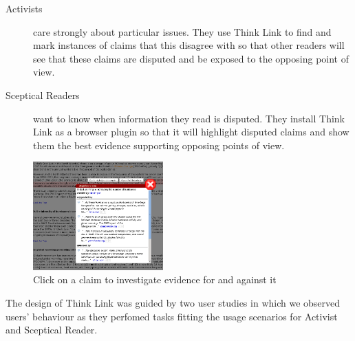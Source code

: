 \documentclass{chi2009}
\newcommand{\todo}[1]{}
\begin{document}
\begin{description}
\item[Activists] care strongly about particular issues. They use Think Link to find and mark instances of claims that this disagree with so that other readers will see that these claims are disputed and be exposed to the opposing point of view.

\item[Sceptical Readers] want to know when information they read is disputed. They install Think Link as a browser plugin so that it will highlight disputed claims and show them the best evidence supporting opposing points of view.
\end{description}

\begin{figure}[tb]
	\begin{center}
	\includegraphics[width=5cm]{../screenshots/v2_popup_dim.png}
	\caption{Click on a claim to investigate evidence for and against it}
	\label{claimview}
	\end{center}
\end{figure}

\todo{Claim panel should have 'more' buttons}


The design of Think Link was guided by two user studies in which we observed users' behaviour as they perfomed tasks fitting the usage scenarios for Activist and Sceptical Reader.

\todo{Talk about automatically including all arguments from Snopes}
\todo{I think we need to do some kind of evaluation of the new interface, even if it is just showing it to some people, or having people in the lab try it.}
\todo{Need figures saying how efficient it is for an activist user to mark up a topic}

\end{document}
